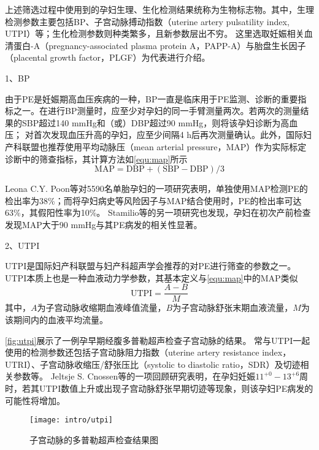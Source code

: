 上述筛选过程中使用到的孕妇生理、生化检测结果统称为生物标志物。其中，生理检测参数主要包括BP、子宫动脉搏动指数（uterine artery pulsatility index, UTPI）等；生化检测参数则种类繁多，且新参数层出不穷\cite{Rene2008,Zhong2015,Zeisler2016,Rana2012}。
这里选取妊娠相关血清蛋白-A（pregnancy-associated plasma protein A，PAPP-A）与胎盘生长因子（placental growth factor，PLGF）为代表进行介绍。

1、BP

由于PE是妊娠期高血压疾病的一种，BP一直是临床用于PE监测、诊断的重要指标之一\cite{OAG9,HDASOM,2000s1}。在进行BP测量时，应至少对孕妇的同一手臂测量两次。若两次的测量结果的SBP超过140 mmHg和（或）DBP超过90 mmHg，则将该孕妇诊断为高血压；
对首次发现血压升高的孕妇，应至少间隔4 h后再次测量确认\cite{OAG9}。此外，国际妇产科联盟也推荐使用平均动脉压（mean arterial pressure，MAP）作为实际标定诊断中的筛查指标\cite{FIGO}，其计算方法如\autoref{equ:map}所示
\begin{equation}
    \label{equ:map}
    \text{MAP}=\text{DBP}+(\text{SBP}-\text{DBP})/3
\end{equation}

Leona C.Y. Poon等\cite{Poon2008}对5590名单胎孕妇的一项研究表明，单独使用MAP检测PE的检出率为38\%；而将孕妇病史等风险因子与MAP结合使用时，PE的检出率可达63\%，其假阳性率为10\%。
Stamilio等\cite{Stamilio2000}的另一项研究也发现，孕妇在初次产前检查发现MAP大于90 mmHg与其PE病发的相关性显著。


2、UTPI

UTPI是国际妇产科联盟与妇产科超声学会推荐的对PE进行筛查的参数之一\cite{FIGO,Sotiriadis2019}。
UTPI本质上也是一种血液动力学参数，其基本定义与\autoref{equ:map}中的MAP类似\cite{Cnossen2008}
\begin{equation}
    \label{equ:utpi}
    \text{UTPI}=\frac{A-B}{M}
\end{equation}
其中，$A$为子宫动脉收缩期血液峰值流量，$B$为子宫动脉舒张末期血液流量，$M$为该期间内的血液平均流量。

\autoref{fig:utpi}展示了一例孕早期经腹多普勒超声检查子宫动脉的结果\cite{Sotiriadis2019}。
常与UTPI一起使用的检测参数还包括子宫动脉阻力指数（uterine artery resistance index，UTRI）、子宫动脉收缩压/舒张压比（systolic to diastolic ratio，SDR）及切迹相关参数等\cite{Cnossen2008}。
Jeltsje S. Cnossen等\cite{Cnossen2008}的一项回顾研究表明，在孕妇妊娠$11^{+0}-13^{+6}$周时，若其UTPI数值上升或出现子宫动脉舒张早期切迹等现象，则该孕妇PE病发的可能性将增加\cite{OAG9,Plasencia2008}。

\begin{figure}[htbp]
    \centering
    \texttt{[image: intro/utpi]}
    \caption{\label{fig:utpi}子宫动脉的多普勒超声检查结果图}
\end{figure}

